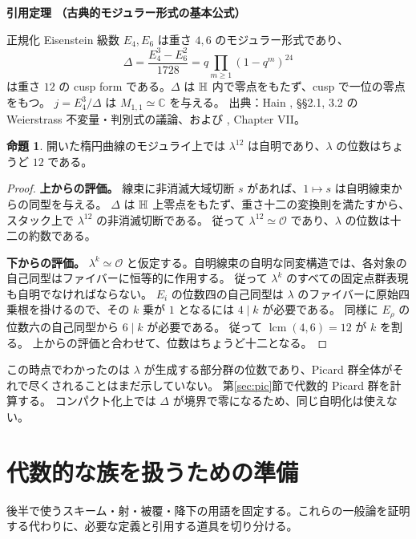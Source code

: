 \documentclass[dvipdfmx,a4paper,11pt]{article}
\theoremstyle{definition}
\newtheorem{prop}[thm]{命題}
\newenvironment{aim}{\begin{tcolorbox}[mybox,colback=green!3,title=この章で考えること,fonttitle=\bfseries]}{\end{tcolorbox}}
\newcommand{\C}{\mathbb C}\newcommand{\R}{\mathbb R}\newcommand{\Z}{\mathbb Z}\newcommand{\Q}{\mathbb Q}
\newcommand{\OO}{\mathcal O}\newcommand{\MM}{\mathcal M}\newcommand{\TT}{\mathcal T}
\newenvironment{external}[1]{\Needspace{7\baselineskip}\refstepcounter{thm}\begin{tcolorbox}[mybox,colback=blue!2,colframe=blue!40!black]\textbf{引用定理 \thethm（#1）}\par}{\end{tcolorbox}}
\begin{document}
\begin{external}{古典的モジュラー形式の基本公式}\label{input:modforms}
正規化 Eisenstein 級数 $E_4,E_6$ は重さ $4,6$ のモジュラー形式であり、
\[
\Delta=\frac{E_4^3-E_6^2}{1728}
=q\prod_{m\ge1}(1-q^m)^{24}
\]
は重さ $12$ の cusp form である。$\Delta$ は $\mathbb H$ 内で零点をもたず、cusp で一位の零点をもつ。
$j=E_4^3/\Delta$ は $M_{1,1}\simeq\C$ を与える。
出典：Hain \cite{Hain}, \S\S2.1, 3.2 の Weierstrass 不変量・判別式の議論、および \cite{Serre}, Chapter VII。
\end{external}
\begin{prop}\label{prop:lambdatorsion}
開いた楕円曲線のモジュライ上では $\lambda^{12}$ は自明であり、$\lambda$ の位数はちょうど $12$ である。
\end{prop}
\begin{proof}
\textbf{上からの評価。}
線束に非消滅大域切断 $s$ があれば、$1\mapsto s$ は自明線束からの同型を与える。
$\Delta$ は $\mathbb H$ 上零点をもたず、重さ十二の変換則を満たすから、スタック上で $\lambda^{12}$ の非消滅切断である。
従って $\lambda^{12}\simeq\OO$ であり、$\lambda$ の位数は十二の約数である。

\textbf{下からの評価。}
$\lambda^k\simeq\OO$ と仮定する。自明線束の自明な同変構造では、各対象の自己同型はファイバーに恒等的に作用する。
従って $\lambda^k$ のすべての固定点群表現も自明でなければならない。
$E_i$ の位数四の自己同型は $\lambda$ のファイバーに原始四乗根を掛けるので、その $k$ 乗が $1$ となるには $4\mid k$ が必要である。
同様に $E_\rho$ の位数六の自己同型から $6\mid k$ が必要である。
従って $\operatorname{lcm}(4,6)=12$ が $k$ を割る。
上からの評価と合わせて、位数はちょうど十二となる。
\end{proof}
この時点でわかったのは $\lambda$ が生成する部分群の位数であり、Picard 群全体がそれで尽くされることはまだ示していない。
第\ref{sec:pic}節で代数的 Picard 群を計算する。
コンパクト化上では $\Delta$ が境界で零になるため、同じ自明化は使えない。

\par\bigskip\Needspace{.70\textheight}
\section{代数的な族を扱うための準備}\label{sec:schemes}
\begin{aim}
後半で使うスキーム・射・被覆・降下の用語を固定する。これらの一般論を証明する代わりに、必要な定義と引用する道具を切り分ける。
\end{aim}
\end{document}

